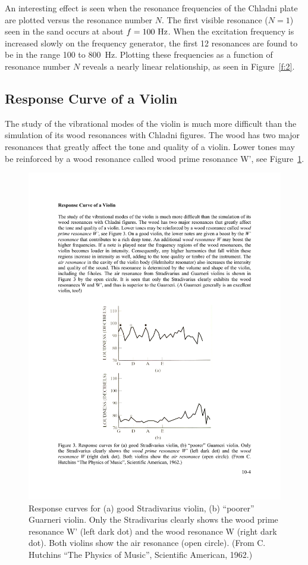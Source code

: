 \documentclass[11pt]{NSF}
\begin{document}
An interesting effect is seen when the resonance frequencies of the
Chladni plate are plotted versus the resonance number $N$. The first
visible resonance ($N = 1$) seen in the sand occurs at about 
$f = 100 ~{\rm Hz}$.
When the excitation frequency is increased slowly on the frequency
generator, the first 12 resonances are found to be in the range 100 to
800~Hz. Plotting these frequencies as a function of resonance number
$N$ reveals a nearly linear relationship, as seen in Figure~\ref{f:2}. 

\subsection{Response Curve of a Violin}

The study of the vibrational modes of the violin is much more
difficult than the simulation of its wood resonances with Chladni
figures. The wood has two major resonances that greatly affect the
tone and quality of a violin. Lower tones may be reinforced by a wood
resonance called wood prime resonance W’, see Figure~\ref{f:3}. 
%
\begin{figure}[hbtp]
\begin{center}
\includegraphics[width=.6\textwidth]{fig10_3}
\caption{Response curves for (a) good Stradivarius violin, (b)
“poorer” Guarneri violin. Only the Stradivarius clearly shows the wood
prime resonance W’ (left dark dot) and the wood resonance W (right
dark dot). Both violins show the air resonance (open circle). (From C.
Hutchins “The Physics of Music”, Scientific American, 1962.)}
\label{f:3}
\end{center}
\end{figure}
\end{document}
